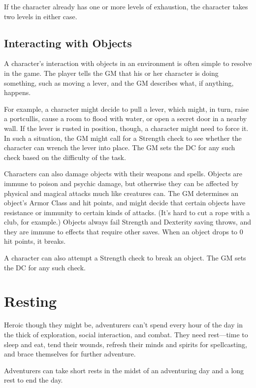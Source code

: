 If the character already has one or more levels of exhaustion, the character takes two levels in either case.

\subsection{Interacting with Objects}

A character's interaction with objects in an environment is often simple to resolve in the game. The player tells the GM that his or her character is doing something, such as moving a lever, and the GM describes what, if anything, happens.

For example, a character might decide to pull a lever, which might, in turn, raise a portcullis, cause a room to flood with water, or open a secret door in a nearby wall. If the lever is rusted in position, though, a character might need to force it. In such a situation, the GM might call for a Strength check to see whether the character can wrench the lever into place. The GM sets the DC for any such check based on the difficulty of the task.

Characters can also damage objects with their weapons and spells. Objects are immune to poison and psychic damage, but otherwise they can be affected by physical and magical attacks much like creatures can. The GM determines an object's Armor Class and hit points, and might decide that certain objects have resistance or immunity to certain kinds of attacks. (It's hard to cut a rope with a club, for example.) Objects always fail Strength and Dexterity saving throws, and they are immune to effects that require other saves. When an object drops to 0 hit points, it breaks.

A character can also attempt a Strength check to break an object. The GM sets the DC for any such check.

\section{Resting}

Heroic though they might be, adventurers can't spend every hour of the day in the thick of exploration, social interaction, and combat. They need rest—time to sleep and eat, tend their wounds, refresh their minds and spirits for spellcasting, and brace themselves for further adventure.

Adventurers can take short rests in the midst of an adventuring day and a long rest to end the day.

